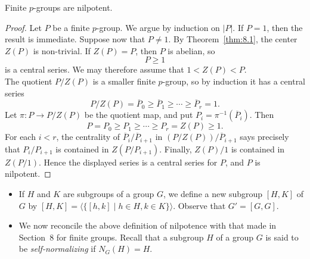 \documentclass[../Odyssey_Project.tex]{subfiles}
\begin{document}
\begin{lemma}
\label{lem:11.14}
Finite $p$-groups are nilpotent.
\end{lemma}
\begin{proof}
    Let $P$ be a finite $p$-group. We argue by induction on $\lvert P\rvert$. If $P=1$, then the result is immediate. Suppose now that $P\neq 1$. By Theorem~\ref{thm:8.1}, the center $Z(P)$ is non-trivial. If $Z(P)=P$, then $P$ is abelian, so
    \[
        P\geq 1
    \]
    is a central series. We may therefore assume that $1<Z(P)<P$.\\
    The quotient $P/Z(P)$ is a smaller finite $p$-group, so by induction it has a central series
    \[
        P/Z(P)=\overline{P}_0\geq \overline{P}_1\geq \cdots \geq \overline{P}_r=1.
    \]
    Let $\pi\colon P\to P/Z(P)$ be the quotient map, and put $P_i=\pi^{-1}(\overline{P}_i)$. Then
    \[
        P=P_0\geq P_1\geq \cdots \geq P_r=Z(P)\geq 1.
    \]
    For each $i<r$, the centrality of $\overline{P}_i/\overline{P}_{i+1}$ in $(P/Z(P))/\overline{P}_{i+1}$ says precisely that $P_i/P_{i+1}$ is contained in $Z(P/P_{i+1})$. Finally, $Z(P)/1$ is contained in $Z(P/1)$. Hence the displayed series is a central series for $P$, and $P$ is nilpotent.
\end{proof}

\begin{itemize}
    \item If $H$ and $K$ are subgroups of a group $G$, we define a new subgroup $[H, K]$ of $G$ by $[H, K] = \langle \{ [h, k] \mid h \in H, k \in K \} \rangle$. Observe that $G' = [G, G]$.
    \item We now reconcile the above definition of nilpotence with that made in Section~8 for finite groups. Recall that a subgroup $H$ of a group $G$ is said to be \emph{self-normalizing} if $N_G(H) = H$.
\end{itemize}
\end{document}
